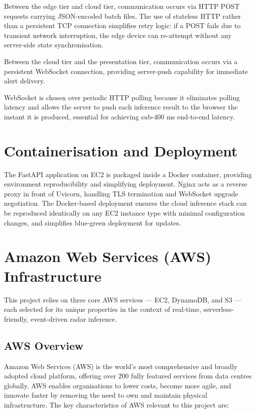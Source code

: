 Between the edge tier and cloud tier, communication occurs via HTTP POST requests carrying JSON-encoded batch files. The use of stateless HTTP rather than a persistent TCP connection simplifies retry logic: if a POST fails due to transient network interruption, the edge device can re-attempt without any server-side state synchronisation.

Between the cloud tier and the presentation tier, communication occurs via a persistent WebSocket connection, providing server-push capability for immediate alert delivery.

WebSocket is chosen over periodic HTTP polling because it eliminates polling latency and allows the server to push each inference result to the browser the instant it is produced, essential for achieving sub-400 ms end-to-end latency.

\section{Containerisation and Deployment}

The FastAPI application on EC2 is packaged inside a Docker container, providing environment reproducibility and simplifying deployment. Nginx acts as a reverse proxy in front of Uvicorn, handling TLS termination and WebSocket upgrade negotiation. The Docker-based deployment ensures the cloud inference stack can be reproduced identically on any EC2 instance type with minimal configuration changes, and simplifies blue-green deployment for updates.


\section{Amazon Web Services (AWS) Infrastructure}

This project relies on three core AWS services --- EC2, DynamoDB, and S3 --- each selected for its unique properties in the context of real-time, serverless-friendly, event-driven radar inference.

\subsection{AWS Overview}

Amazon Web Services (AWS) is the world's most comprehensive and broadly adopted cloud platform, offering over 200 fully featured services from data centres globally. AWS enables organisations to lower costs, become more agile, and innovate faster by removing the need to own and maintain physical infrastructure. The key characteristics of AWS relevant to this project are:

